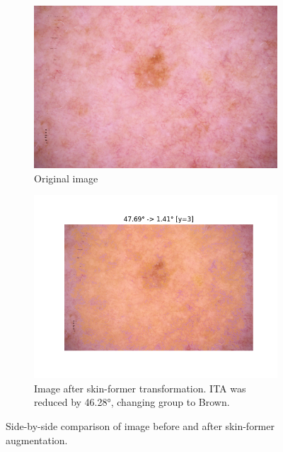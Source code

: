 \begin{figure}[ht]
    \centering
    \begin{subfigure}[b]{0.45\textwidth}
        \includegraphics[width=\linewidth]{figures/skin_former/ISIC_0081956.jpg}
        \caption{Original image}
        \label{fig:original_image}
    \end{subfigure}
    \hfill
    \begin{subfigure}[b]{0.45\textwidth}
        \includegraphics[width=\linewidth]{figures/skin_former/ISIC_0081956.jpg_shifted.png}
        \caption{Image after skin-former transformation. ITA was reduced by 46.28°, changing group to Brown.}
        \label{fig:augmented_image}
    \end{subfigure}
    \caption{Side-by-side comparison of image before and after skin-former augmentation.}
    \label{fig:sidebyside_skinformer}
\end{figure}

